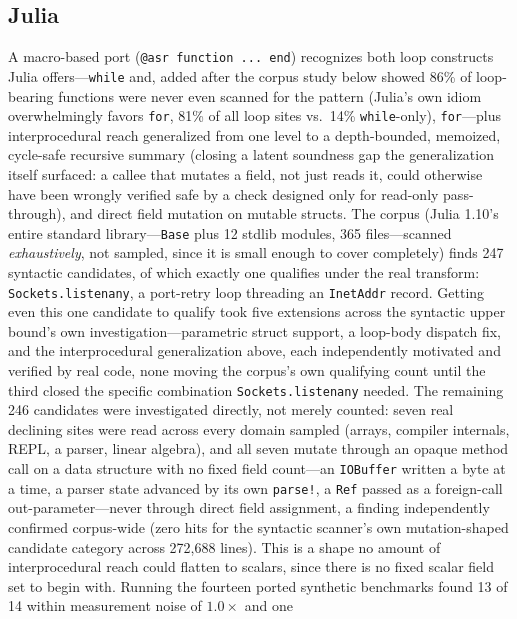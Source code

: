 \documentclass[sigplan,screen,review,anonymous]{acmart}
\begin{document}
\subsection{Julia}

A macro-based port (\texttt{@asr function ... end}) recognizes both
loop constructs Julia offers---\texttt{while} and, added after the
corpus study below showed 86\% of loop-bearing functions were never
even scanned for the pattern (Julia's own idiom overwhelmingly favors
\texttt{for}, 81\% of all loop sites vs.\ 14\% \texttt{while}-only),
\texttt{for}---plus interprocedural reach generalized from one level to
a depth-bounded, memoized, cycle-safe recursive summary (closing a
latent soundness gap the generalization itself surfaced: a callee that
mutates a field, not just reads it, could otherwise have been wrongly
verified safe by a check designed only for read-only pass-through), and
direct field mutation on mutable structs. The corpus (Julia 1.10's
entire standard library---\texttt{Base} plus 12 stdlib modules, 365
files---scanned \emph{exhaustively}, not sampled, since it is small
enough to cover completely) finds 247 syntactic candidates, of which
exactly one qualifies under the real transform: \texttt{Sockets.listenany},
a port-retry loop threading an \texttt{InetAddr} record. Getting even
this one candidate to qualify took five extensions across the syntactic
upper bound's own investigation---parametric struct support, a
loop-body dispatch fix, and the interprocedural generalization above,
each independently motivated and verified by real code, none moving
the corpus's own qualifying count until the third closed the specific
combination \texttt{Sockets.listenany} needed. The remaining 246
candidates were investigated directly, not merely counted: seven real
declining sites were read across every domain sampled (arrays, compiler
internals, REPL, a parser, linear algebra), and all seven mutate
through an opaque method call on a data structure with no fixed field
count---an \texttt{IOBuffer} written a byte at a time, a parser state
advanced by its own \texttt{parse!}, a \texttt{Ref} passed as a
foreign-call out-parameter---never through direct field assignment, a
finding independently confirmed corpus-wide (zero hits for the
syntactic scanner's own mutation-shaped candidate category across
272{,}688 lines). This is a shape no amount of interprocedural
reach could flatten to scalars, since there is no fixed scalar field
set to begin with. Running the fourteen ported synthetic benchmarks
found 13 of 14 within measurement noise of $1.0\times$ and one
\end{document}
